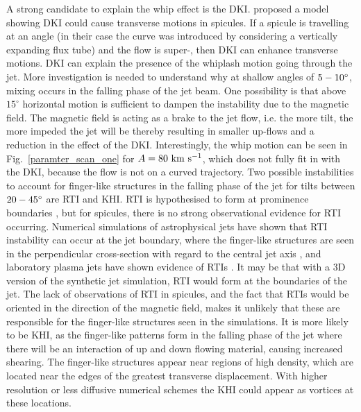 A strong candidate to explain the whip effect is the DKI. \cite{Zaqarashvili2020ApJ893L46Z} proposed a model showing DKI could cause transverse motions in spicules. If a spicule is travelling at an angle (in their case the curve was introduced by considering a vertically expanding flux tube) and the flow is super-\Alfvenic, then DKI can enhance transverse motions. DKI can explain the presence of the whiplash motion going through the jet. More investigation is needed to understand why at shallow angles of $5-10^{\circ}$, mixing occurs in the falling phase of the jet beam. One possibility is that above $15^{\circ}$ horizontal motion is sufficient to dampen the instability due to the magnetic field. The magnetic field is acting as a brake to the jet flow, i.e. the more tilt, the more impeded the jet will be thereby resulting in smaller up-flows and a reduction in the effect of the DKI. Interestingly, the whip motion can be seen in Fig.~\ref{paramter_scan_one} for $A=80 ~\rm{km ~s^{-1}}$, which does not fully fit in with the DKI, because the flow is not on a curved trajectory. \np 
Two possible instabilities to account for finger-like structures in the falling phase of the jet for tilts between $20-45^{\circ}$ are RTI and KHI. RTI is hypothesised to form at prominence boundaries \citep{Berger2008ApJ676L89B,Berger2010ApJ7161288B,Hillier2012ApJ746120H,Berger2017ApJ85060B}, but for spicules, there is no strong observational evidence for RTI occurring. Numerical simulations of astrophysical jets have shown that RTI instability can occur at the jet boundary, where the finger-like structures are seen in the perpendicular cross-section with regard to the central jet axis \citep{Toma2017MNRAS4721253T,Matsumoto2017MNRAS4721421M}, and laboratory plasma jets have shown evidence of RTIs \citep{Zhai2016PhPl23c2121Z}. It may be that with a 3D version of the synthetic jet simulation, RTI would form at the boundaries of the jet. The lack of observations of RTI in spicules, and the fact that RTIs would be oriented in the direction of the magnetic field, makes it unlikely that these are responsible for the finger-like structures seen in the simulations. It is more likely to be KHI, as the finger-like patterns form in the falling phase of the jet where there will be an interaction of up and down flowing material, causing increased shearing. The finger-like structures appear near regions of high density, which are located near the edges of the greatest transverse displacement. With higher resolution or less diffusive numerical schemes the KHI could appear as vortices at these locations. \np
